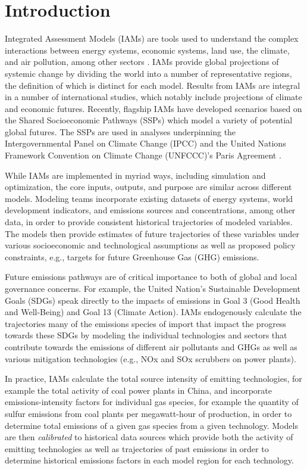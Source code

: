 \section{Introduction}

Integrated Assessment Models (IAMs) are tools used to understand the complex
interactions between energy systems, economic systems, land use, the climate,
and air pollution, among other sectors . IAMs provide global projections of
systemic change by dividing the world into a number of representative regions,
the definition of which is distinct for each model. Results from IAMs are
integral in a number of international studies, which notably include projections
of climate and economic futures. Recently, flagship IAMs have developed
scenarios based on the Shared Socioeconomic Pathways (SSPs)
\cite{van_vuuren_energy_2017, fricko_marker_2017, fujimori_ssp3:_2017,
  calvin_ssp4:_2017, kriegler_fossil-fueled_2017} which model a variety of
potential global futures. The SSPs are used in analyses underpinning the
Intergovernmental Panel on Climate Change (IPCC) and the United Nations
Framework Convention on Climate Change (UNFCCC)'s Paris Agreement .

While IAMs are implemented in myriad ways, including simulation and
optimization, the core inputs, outputs, and purpose are similar across different
models. Modeling teams incorporate existing datasets of energy systems, world
development indicators, and emissions sources and concentrations, among other
data, in order to provide consistent historical trajectories of modeled
variables. The models then provide estimates of future trajectories of these
variables under various socioeconomic and technological assumptions as well as
proposed policy constraints, e.g., targets for future Greenhouse Gas (GHG)
emissions.

Future emissions pathways are of critical importance to both of global and local
governance concerns. For example, the United Nation's Sustainable Development
Goals (SDGs)  speak directly to the impacts of emissions in Goal 3
(Good Health and Well-Being) and Goal 13 (Climate Action). IAMs endogenously
calculate the trajectories many of the emissions species of import that impact
the progress towards these SDGs by modeling the individual technologies and
sectors that contribute towards the emissions of different air pollutants and
GHGs as well as various mitigation technologies (e.g., NOx and SOx scrubbers on
power plants).

In practice, IAMs calculate the total source intensity of emitting technologies,
for example the total activity of coal power plants in China, and incorporate
emissions-intensity factors for individual gas species, for example the quantity
of sulfur emissions from coal plants per megawatt-hour of production, in order
to determine total emissions of a given gas species from a given
technology. Models are then \textit{calibrated} to historical data sources which
provide both the activity of emitting technologies as well as trajectories of
past emissions in order to determine historical emissions factors in each model
region for each technology.

